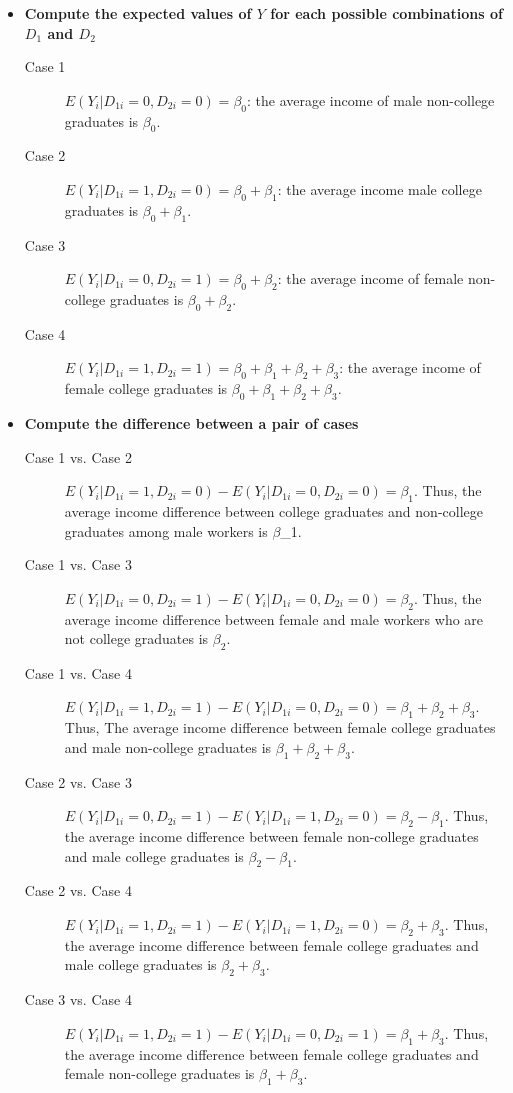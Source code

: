 \documentclass[a4paper,11pt]{article}
\begin{document}
\begin{itemize}
\item \textbf{Compute the expected values of \(Y\) for each possible combinations of \(D_1\) and \(D_2\)}
\label{sec:org6cb5d8c}

\begin{description}
\item[{Case 1}] \(E(Y_i | D_{1i} = 0, D_{2i} = 0) = \beta_0\): the average
income of male non-college graduates is \(\beta_0\).
\item[{Case 2}] \(E(Y_i | D_{1i} = 1, D_{2i} = 0) = \beta_0 + \beta_1\): the
average income male college graduates is \(\beta_0 +
            \beta_1\).
\item[{Case 3}] \(E(Y_i | D_{1i} = 0, D_{2i} = 1) = \beta_0 + \beta_2\): the
average income of female non-college graduates is
\(\beta_0 + \beta_2\).
\item[{Case 4}] \(E(Y_i | D_{1i} = 1, D_{2i} = 1) = \beta_0 + \beta_1 +
            \beta_2 + \beta_3\): the average income of female college
graduates is \(\beta_0 + \beta_1 + \beta_2 + \beta_3\).
\end{description}

\item \textbf{Compute the difference between a pair of cases}
\label{sec:orgcc649e8}

\begin{description}
\item[{Case 1 vs. Case 2}] \(E(Y_i | D_{1i} = 1, D_{2i} = 0) - E(Y_i |
     D_{1i} = 0, D_{2i} = 0) = \beta_1\). Thus, the average income
difference between college graduates and non-college graduates among
male workers is \(\beta\)\_1.
\item[{Case 1 vs. Case 3}] \(E(Y_i | D_{1i} = 0, D_{2i} = 1) - E(Y_i |
     D_{1i} = 0, D_{2i} = 0) = \beta_2\). Thus, the average income
difference between female and male workers who are not college
graduates is \(\beta_2\).
\item[{Case 1 vs. Case 4}] \(E(Y_i | D_{1i} = 1, D_{2i} = 1) - E(Y_i |
     D_{1i} = 0, D_{2i} = 0) = \beta_1 + \beta_2 + \beta_3\). Thus, The
average income difference between female college graduates and
male non-college graduates is \(\beta_1 + \beta_2 + \beta_3\).
\item[{Case 2 vs. Case 3}] \(E(Y_i | D_{1i} = 0, D_{2i} = 1) - E(Y_i |
     D_{1i} = 1, D_{2i} = 0) = \beta_2 - \beta_1\). Thus, the average
income difference between female non-college graduates and male
college graduates is \(\beta_2 - \beta_1\).
\item[{Case 2 vs. Case 4}] \(E(Y_i | D_{1i} = 1, D_{2i} = 1) - E(Y_i |
     D_{1i} = 1, D_{2i} = 0) = \beta_2 + \beta_3\). Thus, the average
income difference between female college graduates and male
college graduates is \(\beta_2 + \beta_3\).
\item[{Case 3 vs. Case 4}] \(E(Y_i | D_{1i} = 1, D_{2i} = 1) - E(Y_i |
     D_{1i} = 0, D_{2i} = 1) = \beta_1 + \beta_3\). Thus, the average
income difference between female college graduates and female
non-college graduates is \(\beta_1 + \beta_3\).
\end{description}


\end{itemize}
\end{document}
